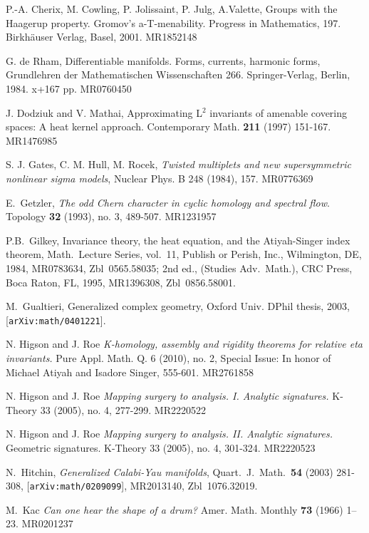 \documentclass[12pt]{amsart}
\theoremstyle{plain}
\theoremstyle{definition}
\theoremstyle{remark}
\begin{document}
{\begin{thebibliography}{99}
P.-A. Cherix, M. Cowling, P. Jolissaint, P. Julg, A.Valette,  Groups with the Haagerup property. Gromov's a-T-menability. Progress in Mathematics, 197. Birkh\"auser Verlag, Basel, 2001. 
 MR1852148

 
G. de Rham,
{Differentiable manifolds. Forms, currents, harmonic forms}, 
Grundlehren der Mathematischen Wissenschaften 266. Springer-Verlag, Berlin, 1984. x+167 pp.
MR0760450

J. Dodziuk and V. Mathai,
Approximating L$^2$ invariants of amenable covering spaces: A heat kernel approach.
Contemporary Math. 
{\bf 211} (1997) 151-167.
MR1476985

S. J. Gates, C. M. Hull, M. Rocek, 
{\it Twisted multiplets and new supersymmetric nonlinear sigma models}, 
Nuclear Phys. B 248 (1984), 157.
 MR0776369
 
E.~Getzler, 
{\it The odd Chern character in cyclic homology and spectral flow}. 
Topology {\bf 32} (1993), no. 3, 489-507. 
MR1231957
 
P.B.~Gilkey,
Invariance theory, the heat equation, and the Atiyah-Singer index theorem,
Math.\ Lecture Series, vol.~11, Publish or Perish, Inc., Wilmington, DE,
1984, MR0783634, Zbl~0565.58035;
2nd ed., (Studies Adv.\ Math.), CRC Press, Boca Raton, FL, 1995,
MR1396308, Zbl~0856.58001.

 
M.~Gualtieri,
{Generalized complex geometry},
Oxford Univ. DPhil thesis, 2003, [{\tt arXiv:math/0401221}].

 N. Higson and J.  Roe {\em{ K-homology, assembly and rigidity theorems for relative eta invariants.}} Pure Appl. Math. Q. 6 (2010), no. 2, Special Issue: In honor of Michael Atiyah and Isadore Singer, 555-601.
MR2761858

 N. Higson and J.  Roe {\em{ Mapping surgery to analysis. I. Analytic signatures.}} K-Theory 33 (2005), no. 4, 277-299. 
MR2220522

 N. Higson and J.  Roe {\em{ Mapping surgery to analysis. II. Analytic signatures.}}  Geometric signatures. K-Theory 33 (2005), no. 4, 301-324.
MR2220523

N.~Hitchin,
{\it Generalized Calabi-Yau manifolds},
Quart.\ J.\ Math.\ {\bf 54} (2003) 281-308, [{\tt arXiv:math/0209099}],
MR2013140, Zbl~1076.32019.
 
  M.~Kac 
\textit{Can one hear the shape of a drum?}
Amer. Math. Monthly {\bf 73} (1966) 1--23.
MR0201237
 

\end{thebibliography}}
\end{document}
